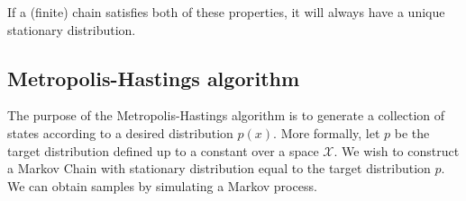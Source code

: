 \documentclass[../main.tex]{subfiles}
\begin{document}
If a (finite) chain satisfies both of these properties, it will always have a
unique stationary distribution.

%
%
%
\subsection{Metropolis-Hastings algorithm}
The purpose of the Metropolis-Hastings algorithm is to generate a collection of
states according to a desired distribution $p(x)$.
%
More formally, let $p$ be the target distribution defined up to a constant over
a space $\mathcal{X}$.
%
We wish to construct a Markov Chain with stationary distribution equal to the
target distribution $p$.
%
We can obtain samples by simulating a Markov process.
\end{document}
